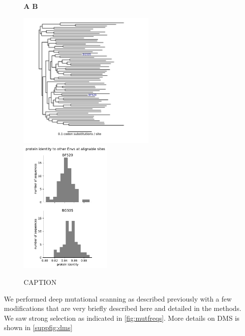 \documentclass[9pt,lineno]{elife}
\begin{document}
\begin{figure}
\centerline{\bf \Large A \hspace{0.52\textwidth} \bf B \hspace{0.35\textwidth}}
\centerline{\includegraphics[width=0.6\textwidth]{figures/tree_plot.pdf} \includegraphics[width=0.4\textwidth]{figures/masked_alignment_identity.pdf}}
\caption{\label{fig:tree}
CAPTION
}
\end{figure}

We performed deep mutational scanning as described previously with a few modifications that are very briefly described here and detailed in the methods.
We saw strong selection as indicated in \ref{fig:mutfreqs}.
More details on DMS is shown in \ref{suppfig:dms}
\end{document}
